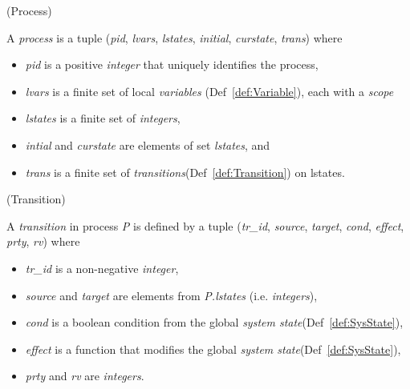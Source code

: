 \begin{definition}{}{}
\label{def:Process}
(Process)

A \textit{process} is a tuple (\textit{pid}, \textit{lvars}, \textit{lstates}, \textit{initial}, \textit{curstate}, \textit{trans}) where
\begin{itemize}
\item[] \textit{pid} is a positive \textit{integer} that uniquely identifies the process,
\item[] \textit{lvars} is a finite set of local \textit{variables} (Def~\ref{def:Variable}), each with a \textit{scope}
\item[] \textit{lstates} is a finite set of \textit{integers},
\item[] \textit{intial} and \textit{curstate} are elements of set \textit{lstates}, and
\item[] \textit{trans} is a finite set of \textit{transitions}(Def~\ref{def:Transition}) on lstates.
\end{itemize}
\end{definition}

\begin{definition}{}{}
\label{def:Transition}
(Transition)

A \textit{transition} in process \textit{P} is defined by a tuple (\textit{tr\_id}, \textit{source}, \textit{target}, \textit{cond}, \textit{effect}, \textit{prty}, \textit{rv}) where
\begin{itemize}
\item[] \textit{tr\_id} is a non-negative \textit{integer},
\item[] \textit{source} and \textit{target} are elements from \textit{P.lstates} (i.e. \textit{integers}),
\item[] \textit{cond} is a boolean condition from the global \textit{system state}(Def~\ref{def:SysState}),
\item[] \textit{effect} is a function that modifies the global \textit{system state}(Def~\ref{def:SysState}),
\item[] \textit{prty} and \textit{rv} are \textit{integers}.
\end{itemize}
\end{definition}

